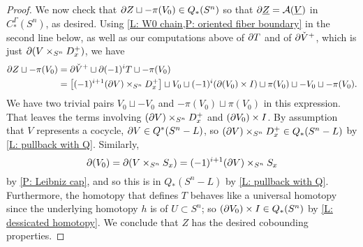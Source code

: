 \begin{proof}
	\begin{comment}
		Similarly, $$\bd \check V^+ = \bd(V \times_{S^n} M_x) = \left[(-1)^{i+1} (\bd V) \times_{S^n} D_x\right] \sqcup (V \times_{S^n} \bd M_x)=(-1)^{i+1} ((\bd V)^+)^\vee \sqcup -V_0.$$
	\end{comment}

	\begin{comment}
		DO I NEED THIS:::
		So, $V_0 = V \times_{S^n} \bd D_x$ represents the same chain as $$\bd(V \times_{S^n} D_x) \sqcup (-1)^{i+1} (\bd V) \times_{S^n} D_x = \bd \check V^- \sqcup (-1)^{i+1} (\bd V) \times_{S^n} D_x.$$
		In particular, the orientation of $V_0$ is the same as the orientation of $\bd \check V^-$.
	\end{comment}



	We now check that $\partial Z \sqcup -\pi(V_0) \in Q_*(S^n)$ so that $\partial \underline{Z} = \mathcal{A}(\underline{V})$ in $C_*^\Gamma(S^n)$, as desired.
	Using \cref{L: W0 chain,P: oriented fiber boundary} in the second line below, as well as our computations above of $\partial T$ and of $\partial \check V^+$, which is just $\partial (V \times_{S^n} D^+_x)$, we have
	\begin{align*}
		\partial Z \sqcup -\pi(V_0) & = \partial \check V^+ \sqcup \partial (-1)^i T \sqcup -\pi(V_0)\\
		&=\left[(-1)^{i+1} (\partial V) \times_{S^n} D_x^+\right] \sqcup V_0 \sqcup
		(-1)^i(\partial (V_0) \times I) \sqcup \pi(V_0)\sqcup -V_0
		\sqcup -\pi(V_0).
	\end{align*}
	We have two trivial pairs $V_0 \sqcup - V_0$ and $ -\pi(V_0) \sqcup \pi(V_0)$ in this expression.
	That leaves the terms involving $(\partial V) \times_{S^n} D_x^+$ and $(\partial V_0) \times I$.
	By assumption that $V$ represents a cocycle, $\partial V \in Q^*(S^n-L)$, so $(\partial V) \times_{S^n} D_x^+ \in Q_*(S^n-L)$ by \cref{L: pullback with Q}.
	Similarly, $$\partial (V_0) = \partial (V \times_{S^n} S_x) = (-1)^{i+1}(\partial V) \times_{S^n} S_x$$ by \cref{P: Leibniz cap}, and so this is in $Q_*(S^n-L)$ by \cref{L: pullback with Q}.
	Furthermore, the homotopy that defines $T$ behaves like a universal homotopy since the underlying homotopy $h$ is of $U \subset S^n$; so $(\partial V_0) \times I \in Q_*(S^n)$ by \cref{L: dessicated homotopy}.
	We conclude that $Z$ has the desired cobounding properties.


\end{proof}
